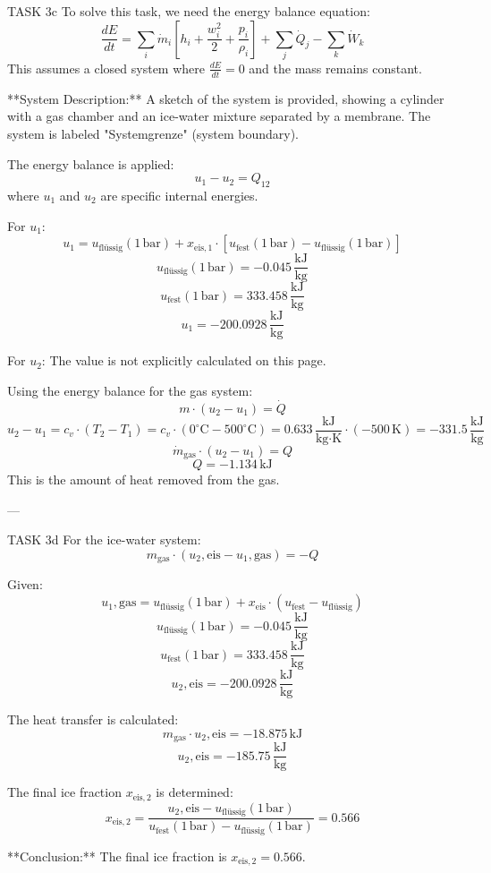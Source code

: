 TASK 3c  
To solve this task, we need the energy balance equation:  
\[
\frac{dE}{dt} = \sum_i \dot{m}_i \left[ h_i + \frac{w_i^2}{2} + \frac{p_i}{\rho_i} \right] + \sum_j \dot{Q}_j - \sum_k \dot{W}_k
\]  
This assumes a closed system where \( \frac{dE}{dt} = 0 \) and the mass remains constant.  

**System Description:**  
A sketch of the system is provided, showing a cylinder with a gas chamber and an ice-water mixture separated by a membrane. The system is labeled "Systemgrenze" (system boundary).  

The energy balance is applied:  
\[
u_1 - u_2 = Q_{12}
\]  
where \( u_1 \) and \( u_2 \) are specific internal energies.  

For \( u_1 \):  
\[
u_1 = u_{\text{flüssig}}(1 \, \text{bar}) + x_{\text{eis},1} \cdot \left[ u_{\text{fest}}(1 \, \text{bar}) - u_{\text{flüssig}}(1 \, \text{bar}) \right]
\]  
\[
u_{\text{flüssig}}(1 \, \text{bar}) = -0.045 \, \frac{\text{kJ}}{\text{kg}}
\]  
\[
u_{\text{fest}}(1 \, \text{bar}) = 333.458 \, \frac{\text{kJ}}{\text{kg}}
\]  
\[
u_1 = -200.0928 \, \frac{\text{kJ}}{\text{kg}}
\]  

For \( u_2 \):  
The value is not explicitly calculated on this page.  

Using the energy balance for the gas system:  
\[
m \cdot (u_2 - u_1) = \dot{Q}
\]  
\[
u_2 - u_1 = c_v \cdot (T_2 - T_1) = c_v \cdot (0^\circ\text{C} - 500^\circ\text{C}) = 0.633 \, \frac{\text{kJ}}{\text{kg·K}} \cdot (-500 \, \text{K}) = -331.5 \, \frac{\text{kJ}}{\text{kg}}
\]  
\[
\dot{m}_{\text{gas}} \cdot (u_2 - u_1) = Q
\]  
\[
Q = -1.134 \, \text{kJ}
\]  
This is the amount of heat removed from the gas.

---

TASK 3d  
For the ice-water system:  
\[
m_{\text{gas}} \cdot (u_2, \text{eis} - u_1, \text{gas}) = -Q
\]  

Given:  
\[
u_1, \text{gas} = u_{\text{flüssig}}(1 \, \text{bar}) + x_{\text{eis}} \cdot (u_{\text{fest}} - u_{\text{flüssig}})
\]  
\[
u_{\text{flüssig}}(1 \, \text{bar}) = -0.045 \, \frac{\text{kJ}}{\text{kg}}
\]  
\[
u_{\text{fest}}(1 \, \text{bar}) = 333.458 \, \frac{\text{kJ}}{\text{kg}}
\]  
\[
u_2, \text{eis} = -200.0928 \, \frac{\text{kJ}}{\text{kg}}
\]  

The heat transfer is calculated:  
\[
m_{\text{gas}} \cdot u_2, \text{eis} = -18.875 \, \text{kJ}
\]  
\[
u_2, \text{eis} = -185.75 \, \frac{\text{kJ}}{\text{kg}}
\]  

The final ice fraction \( x_{\text{eis},2} \) is determined:  
\[
x_{\text{eis},2} = \frac{u_2, \text{eis} - u_{\text{flüssig}}(1 \, \text{bar})}{u_{\text{fest}}(1 \, \text{bar}) - u_{\text{flüssig}}(1 \, \text{bar})} = 0.566
\]  

**Conclusion:**  
The final ice fraction is \( x_{\text{eis},2} = 0.566 \).